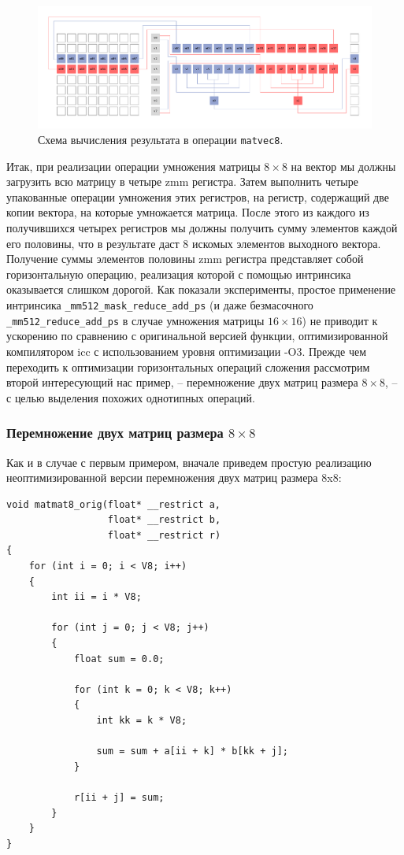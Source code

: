\begin{figure}[ht]
\centering
\includegraphics[width=1.0\textwidth]{./pics/text_4_small_matr/matvec8.pdf}
\caption{Схема вычисления результата в операции \texttt{matvec8}.}
	\label{fig:text_4_small_matr_matvec8}
\end{figure}

Итак, при реализации операции умножения матрицы $8 \times 8$ на вектор мы должны загрузить всю матрицу в четыре zmm регистра.
Затем выполнить четыре упакованные операции умножения этих регистров, на регистр, содержащий две копии вектора, на которые умножается матрица.
После этого из каждого из получившихся четырех регистров мы должны получить сумму элементов каждой его половины, что в результате даст 8 искомых элементов выходного вектора.
Получение суммы элементов половины zmm регистра представляет собой горизонтальную операцию, реализация которой с помощью интринсика оказывается слишком дорогой.
Как показали эксперименты, простое применение интринсика \texttt{\_mm512\_mask\_reduce\_add\_ps} (и даже безмасочного \texttt{\_mm512\_reduce\_add\_ps} в случае умножения матрицы $16 \times 16$) не приводит к ускорению по сравнению с оригинальной версией функции, оптимизированной компилятором icc с использованием уровня оптимизации -O3.
Прежде чем переходить к оптимизации горизонтальных операций сложения рассмотрим второй интересующий нас пример, -- перемножение двух матриц размера $8 \times 8$, -- с целью выделения похожих однотипных операций.

\subsubsection{Перемножение двух матриц размера $8 \times 8$}

Как и в случае с первым примером, вначале приведем простую реализацию неоптимизированной версии перемножения двух матриц размера 8x8:

\begin{lstlisting}[caption={Невекторизованная версия перемножения матриц размера $8 \times 8$}, label={lst:text_4_small_matr_8x8_mul_matr_noopt}]
void matmat8_orig(float* __restrict a,
                  float* __restrict b,
                  float* __restrict r)
{
    for (int i = 0; i < V8; i++)
    {
        int ii = i * V8;
 
        for (int j = 0; j < V8; j++)
        {
            float sum = 0.0;

            for (int k = 0; k < V8; k++)
            {
                int kk = k * V8;
                
                sum = sum + a[ii + k] * b[kk + j];
            }

            r[ii + j] = sum;
        }
    }
}
\end{lstlisting}


